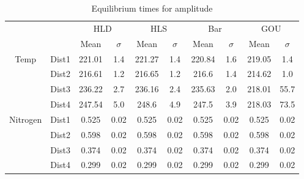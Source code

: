 \begin{table}[h]
\centering
\caption{Equilibrium times for amplitude}
\label{table:5}
\begin{tabular}{cccccccccc}
\toprule
 &  & \multicolumn{2}{c}{HLD} & \multicolumn{2}{c}{HLS} & \multicolumn{2}{c}{Bar} & \multicolumn{2}{c}{GOU} \\
 &  & Mean & $\sigma$ & Mean & $\sigma$ & Mean & $\sigma$ & Mean & $\sigma$ \\
\midrule
\multirow[c]{4}{*}{Temp} & Dist1 & 221.01 & 1.4 & 221.27 & 1.4 & 220.84 & 1.6 & 219.05 & 1.4 \\
 & Dist2 & 216.61 & 1.2 & 216.65 & 1.2 & 216.6 & 1.4 & 214.62 & 1.0 \\
 & Dist3 & 236.22 & 2.7 & 236.16 & 2.4 & 235.63 & 2.0 & 218.01 & 55.7 \\
 & Dist4 & 247.54 & 5.0 & 248.6 & 4.9 & 247.5 & 3.9 & 218.03 & 73.5 \\
\multirow[c]{4}{*}{Nitrogen} & Dist1 & 0.525 & 0.02 & 0.525 & 0.02 & 0.525 & 0.02 & 0.525 & 0.02 \\
 & Dist2 & 0.598 & 0.02 & 0.598 & 0.02 & 0.598 & 0.02 & 0.598 & 0.02 \\
 & Dist3 & 0.374 & 0.02 & 0.374 & 0.02 & 0.374 & 0.02 & 0.374 & 0.02 \\
 & Dist4 & 0.299 & 0.02 & 0.299 & 0.02 & 0.299 & 0.02 & 0.299 & 0.02 \\
\bottomrule
\end{tabular}
\end{table}
